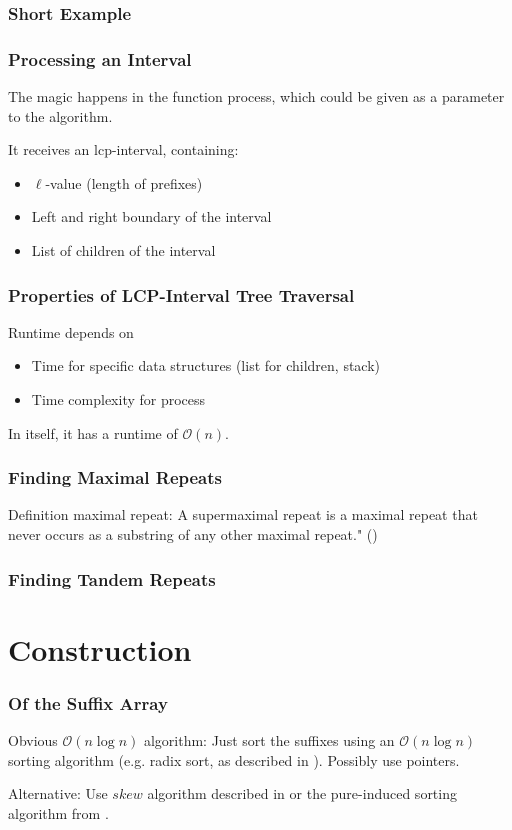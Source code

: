 \documentclass[compress,handout]{beamer} %
\renewcommand{\O}{\mathcal{O}}
\begin{document}
\begin{frame}
	\frametitle{Short Example}
\end{frame}

\begin{frame}
	\frametitle{Processing an Interval}
	The magic happens in the function process, which could be given
	as a parameter to the algorithm.

	It receives an lcp-interval, containing:
	\begin{itemize}
		\item $\ell$-value (length of prefixes)
		\item Left and right boundary of the interval
		\item List of children of the interval
	\end{itemize}
\end{frame}

\begin{frame}
	\frametitle{Properties of LCP-Interval Tree Traversal}
	Runtime depends on
	\begin{itemize}
		\item Time for specific data structures (list for children, stack)
		\item Time complexity for process
	\end{itemize}

	In itself, it has a runtime of $\O(n)$.
\end{frame}

\begin{frame}
	\frametitle{Finding Maximal Repeats}

	Definition maximal repeat: \dq A supermaximal repeat is a maximal
	repeat that never occurs as a substring of any other maximal
	repeat." (\cite{abouelhoda2002enhanced})
\end{frame}

\begin{frame}
	\frametitle{Finding Tandem Repeats}
\end{frame}

\section{Construction}

\begin{frame}
	\frametitle{Of the Suffix Array} Obvious $\O(n \log n)$
	algorithm: Just sort the suffixes using an $\O(n \log
	n)$ sorting algorithm (e.g. radix sort, as described in
	\cite{manber1993suffix}). Possibly use pointers.

	Alternative: Use $skew$ algorithm described in
	\cite{karkkainen2003simple} or the pure-induced sorting
	algorithm from \cite{nong2009linear}.
\end{frame}
\end{document}
